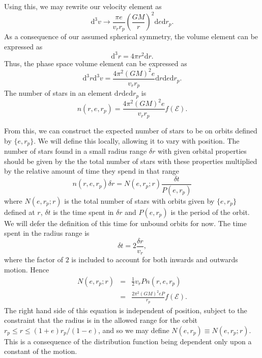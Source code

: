 \documentclass[useAMS,usedcolumn,usegraphicx,usenatbib]{mn2e}
\newcommand{\dd}{\ensuremath{\mathrm{d}}}
\newcommand{\recip}[1]{\ensuremath{\frac{1}{#1}}}
\begin{document}
Using this, we may rewrite our velocity element as
\begin{equation}
\dd^3v \rightarrow \frac{\pi e}{v_rr_p}\left(\frac{GM}{r}\right)^2\dd e \dd r_p.
\end{equation}
As a consequence of our assumed spherical symmetry, the volume element can be expressed as
\begin{equation}
\dd^3r = 4\pi r^2 \dd r.
\end{equation}
Thus, the phase space volume element can be expressed as
\begin{equation}
\dd^3r\dd^3v = \frac{4\pi^2(GM)^2e}{v_rr_p}\dd r\dd e \dd r_p.
\end{equation}
The number of stars in an element $\dd r\dd e \dd r_p$ is
\begin{equation}
n(r, e, r_p) = \frac{4\pi^2(GM)^2e}{v_rr_p}f(\mathcal{E}).
\end{equation}

From this, we can construct the expected number of stars to be on orbits defined by $\{e, r_p\}$. We will define this locally, allowing it to vary with position. The number of stars found in a small radius range $\delta r$ with given orbital properties should be given by the the total number of stars with these properties multiplied by the relative amount of time they spend in that range
\begin{equation}
n(r, e, r_p)\delta r = N(e, r_p; r)\frac{\delta t}{P(e, r_p)}
\end{equation}
where $N(e, r_p; r)$ is the total number of stars with orbits given by $\{e, r_p\}$ defined at $r$, $\delta t$ is the time spent in $\delta r$ and $P(e, r_p)$ is the period of the orbit. We will defer the definition of this time for unbound orbits for now. The time spent in the radius range is
\begin{equation}
\delta t = 2\frac{\delta r}{v_r},
\end{equation}
where the factor of $2$ is included to account for both inwards and outwards motion. Hence
\begin{eqnarray}
N(e, r_p; r) &=& \recip{2} v_r P n(r, e, r_p)\\
 &=& \frac{2\pi^2(GM)^2 e P}{r_p}f(\mathcal{E}).
\end{eqnarray}
The right hand side of this equation is independent of position, subject to the constraint that the radius is in the allowed range for the orbit $r_p \leq r \leq (1+e)r_p/(1-e)$, and so we may define $N(e, r_p) \equiv N(e, r_p; r)$. This is a consequence of the distribution function being dependent only upon a constant of the motion.
\end{document}
